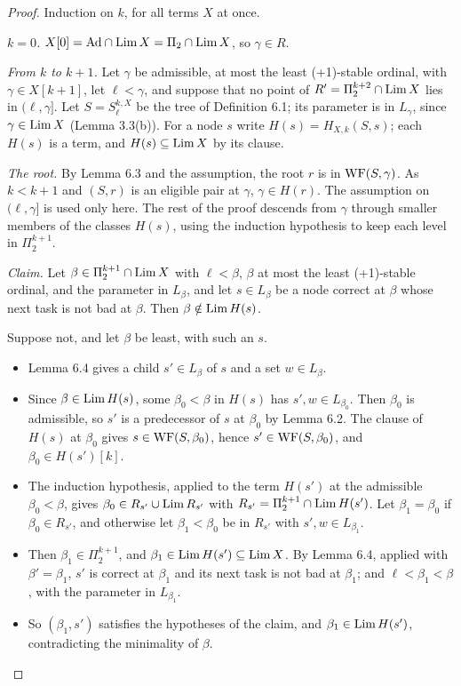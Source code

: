 \documentclass[11pt]{article}
\begin{document}
\begin{proof}
Induction on $k$, for all terms $X$ at once.

\emph{$k = 0$.} $X[0] = \mathrm{Ad} \cap \mathrm{Lim}\, X = \Pi_2 \cap \mathrm{Lim}\, X$, so $\gamma \in R$.

\emph{From $k$ to $k+1$.} Let $\gamma$ be admissible, at most the least (+1)-stable ordinal, with $\gamma \in
X[k+1]$, let $\ell < \gamma$, and
suppose that no point of $R' = \Pi_2^{k+2} \cap \mathrm{Lim}\, X$ lies in $(\ell, \gamma]$. Let $S = S^{k,X}_\ell$ be the tree of
Definition 6.1; its parameter is in $L_\gamma$, since $\gamma \in \mathrm{Lim}\, X$ (Lemma 3.3(b)). For a node $s$ write $H(s) =
H_{X,k}(S, s)$; each $H(s)$ is a term, and $H(s) \subseteq \mathrm{Lim}\, X$ by its clause.

\emph{The root.} By Lemma 6.3 and the assumption, the root $r$ is in $\mathrm{WF}(S, \gamma)$. As $k < k+1$ and $(S, r)$ is an
eligible pair at $\gamma$, $\gamma \in H(r)$. The assumption on $(\ell, \gamma]$ is used only here. The rest of the
proof descends from $\gamma$ through smaller members of the classes $H(s)$, using the induction hypothesis to keep each
level in $\Pi_2^{k+1}$.

\emph{Claim.} Let $\beta \in \Pi_2^{k+1} \cap \mathrm{Lim}\, X$ with $\ell < \beta$, $\beta$ at most the least (+1)-stable
ordinal, and the parameter in $L_\beta$, and let
$s \in L_\beta$ be a node correct at $\beta$ whose next task is not bad at $\beta$. Then $\beta \notin \mathrm{Lim}\, H(s)$.

Suppose not, and let $\beta$ be least, with such an $s$.
\begin{itemize}
\item Lemma 6.4 gives a child $s' \in L_\beta$ of $s$ and a set $w \in L_\beta$.
\item Since $\beta \in \mathrm{Lim}\, H(s)$, some $\beta_0 < \beta$ in $H(s)$ has $s', w \in L_{\beta_0}$. Then $\beta_0$ is
  admissible, so $s'$ is a predecessor of $s$ at $\beta_0$ by Lemma 6.2. The clause of $H(s)$ at $\beta_0$ gives $s \in
  \mathrm{WF}(S, \beta_0)$, hence $s' \in \mathrm{WF}(S, \beta_0)$, and $\beta_0 \in H(s')[k]$.
\item The induction hypothesis, applied to the term $H(s')$ at the admissible $\beta_0 < \beta$, gives $\beta_0 \in
  R_{s'} \cup \mathrm{Lim}\, R_{s'}$ with $R_{s'} = \Pi_2^{k+1} \cap \mathrm{Lim}\, H(s')$. Let $\beta_1 = \beta_0$ if $\beta_0 \in R_{s'}$, and
  otherwise let $\beta_1 < \beta_0$ be in $R_{s'}$ with $s', w \in L_{\beta_1}$.
\item Then $\beta_1 \in \Pi_2^{k+1}$, and $\beta_1 \in \mathrm{Lim}\, H(s') \subseteq \mathrm{Lim}\, X$. By Lemma 6.4, applied with $\beta' =
  \beta_1$, $s'$ is correct at $\beta_1$ and its next task is not bad at $\beta_1$; and $\ell < \beta_1 < \beta$, with
  the parameter in $L_{\beta_1}$.
\item So $(\beta_1, s')$ satisfies the hypotheses of the claim, and $\beta_1 \in \mathrm{Lim}\, H(s')$, contradicting the
  minimality of $\beta$.
\end{itemize}


\end{proof}
\end{document}
